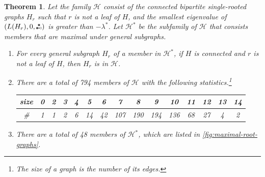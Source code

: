 \documentclass[11pt]{article}
\newtheorem{theorem}{Theorem}[section]
\theoremstyle{definition}
\theoremstyle{remark}
\newcommand{\las}{\lambda^*}
\newcommand{\HH}{\mathcal{H}}
\newcommand{\etwo}{\tikz[baseline=-0.2ex, scale=0.9]{\draw[darkgray, thick] (0,0)--(0.2,0); \draw[darkgray, fill=darkgray] (0,0) circle (0.05); \draw[darkgray, fill=darkgray] (0.1,0.17320508075) circle (0.05); \draw[darkgray, fill=white] (0.2,0) circle (0.05);}}
\newcommand{\ape}[1]{(#1,\etwo)}
\begin{document}
\begin{theorem} \label{thm:enumeration}
    Let the family $\HH$ consist of the connected bipartite single-rooted graphs $H_r$ such that $r$ is not a leaf of $H$, and the smallest eigenvalue of $\ape{L(H_r), 0}$ is greater than $-\las$. Let $\HH^*$ be the subfamily of $\HH$ that consists members that are maximal under general subgraphs.
    \begin{enumerate}[label=(\alph*)]
        \item For every general subgraph $H_r$ of a member in $\HH^*$, if $H$ is connected and $r$ is not a leaf of $H$, then $H_r$ is in $\HH$. \label{item:enum-a}
        \item There are a total of 794 members of $\HH$ with the following statistics.\footnote{The \emph{size} of a graph is the number of its edges.}
        \begin{center}
            \begin{tabular}{ccccccccccccccc}
                size & 0 & 2 & 3 & 4 & 5 & 6 & 7 & 8 & 9 & 10 & 11 & 12 & 13 & 14 \\
                \hline
                \# & 1 & 1 & 2 & 6 & 14 & 42 & 107 & 190 & 194 & 136 & 68 & 27 & 4 & 2
            \end{tabular}
        \end{center}
        \item There are a total of 48 members of $\HH^*$, which are listed in \cref{fig:maximal-root-graphs}.
    \end{enumerate}
\end{theorem}
\end{document}
